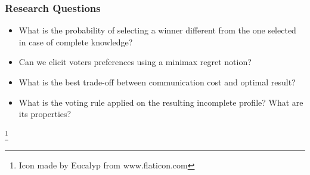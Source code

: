 \documentclass[aspectratio=169]{beamer}
\begin{document}
\begin{frame}
\begin{columns}
\begin{column}{0.45\textwidth}
		\end{column}
	\end{columns}
\begin{center}
\end{center}
\end{frame}

\begin{frame}
	\frametitle{Research Questions}
	\begin{itemize}
		\item What is the probability of selecting a winner different from the one selected in case of complete knowledge?
		\item Can we elicit voters preferences using a minimax regret notion?
		\item What is the best trade-off between communication cost and optimal result?
		\item What is the voting rule applied on the resulting incomplete profile? What are its properties?
	\end{itemize}
\end{frame}

\addtocounter{framenumber}{-1}
\begin{frame}[plain]
	{\let\thefootnote\relax\footnote{\tiny Icon made by Eucalyp from www.flaticon.com}}
\end{frame}
\end{document}
